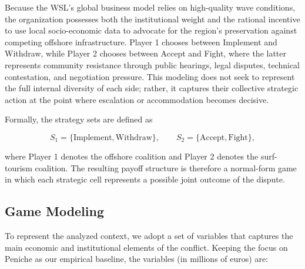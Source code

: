\documentclass[final,times,authoryear]{elsarticle}
\begin{document}
Because the WSL's global business model relies on high-quality wave conditions, the organization possesses both the institutional weight and the rational incentive to use local socio-economic data to advocate for the region's preservation against competing offshore infrastructure. Player 1 chooses between Implement and Withdraw, while Player 2 chooses between Accept and Fight, where the latter represents community resistance through public hearings, legal disputes, technical contestation, and negotiation pressure. This modeling does not seek to represent the full internal diversity of each side; rather, it captures their collective strategic action at the point where escalation or accommodation becomes decisive.

Formally, the strategy sets are defined as

    \begin{equation}
    S_1 = \{\text{Implement}, \text{Withdraw}\}, \qquad S_2 = \{\text{Accept}, \text{Fight}\},
    \end{equation}

where Player 1 denotes the offshore coalition and Player 2 denotes the surf-tourism coalition. The resulting payoff structure is therefore a normal-form game in which each strategic cell represents a possible joint outcome of the dispute.

\subsection{Game Modeling}

To represent the analyzed context, we adopt a set of variables that captures the main economic and institutional elements of the conflict. Keeping the focus on Peniche as our empirical baseline, the variables (in millions of euros) are:
\end{document}
